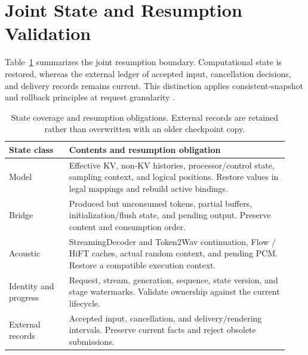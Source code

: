 \section{Joint State and Resumption Validation}
\label{app:state_contract}

Table~\ref{tab:app_state_contract} summarizes the joint resumption
boundary. Computational state is restored, whereas the external ledger
of accepted input, cancellation decisions, and delivery records remains current.
This distinction applies consistent-snapshot and rollback principles at request granularity \citep{chandy1985,elnozahy2002}.

\begin{table}[tbp]
    \centering
    \small
    \setlength{\tabcolsep}{5pt}
    \caption{
        State coverage and resumption obligations.
        External records are retained rather than overwritten
        with an older checkpoint copy.
    }
    \label{tab:app_state_contract}
    \begin{tabular}{
        @{}
        >{\raggedright\arraybackslash}p{0.20\linewidth}
        >{\raggedright\arraybackslash}p{0.73\linewidth}
        @{}
    }
        \toprule
        State class & Contents and resumption obligation \\
        \midrule
        Model
        & Effective KV, non-KV histories, processor/control state,
          sampling context, and logical positions.
          Restore values in legal mappings and rebuild active bindings. \\
        Bridge
        & Produced but unconsumed tokens, partial buffers,
          initialization/flush state, and pending output.
          Preserve content and consumption order. \\
        Acoustic
        & StreamingDecoder and Token2Wav continuation,
          Flow / HiFT caches, actual random context, and pending PCM.
          Restore a compatible execution context. \\
        Identity and progress
        & Request, stream, generation, sequence, state version,
          and stage watermarks.
          Validate ownership against the current lifecycle. \\
        External records
        & Accepted input, cancellation, and delivery/rendering intervals.
          Preserve current facts and reject obsolete submissions. \\
        \bottomrule
    \end{tabular}
\end{table}

